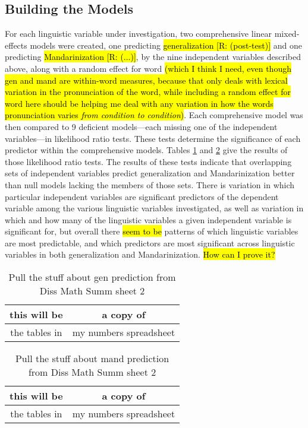 \subsection{Building the Models} 
For each linguistic variable under investigation, two comprehensive linear mixed-effects models were created, one predicting \hl{generalization [R: (post-test)]} and one predicting \hl{Mandarinization [R: (...)]}, by the nine independent variables described above, along with a random effect for word \hl{(which I think I need, even though gen and mand are within-word measures, because that only deals with lexical variation in the pronunciation of the word, while including a random effect for word here should be helping me deal with any variation in how the words pronunciation varies \textit{from condition to condition})}. Each comprehensive model was then compared to 9 deficient models---each missing one of the independent variables---in likelihood ratio tests. These tests determine the significance of each predictor within the comprehensive models. Tables \ref{tab:generalizationPredictors} and \ref{tab:mandarinizationPredictors} give the results of those likelihood ratio tests. The results of these tests indicate that overlapping sets of independent variables predict generalization and Mandarinization better than null models lacking the members of those sets. There is variation in which particular independent variables are significant predictors of the dependent variable among the various linguistic variables investigated, as well as variation in which and how many of the linguistic variables a given independent variable is significant for, but overall there \hl{seem to be} patterns of which linguistic variables are most predictable, and which predictors are most significant across linguistic variables in both generalization and Mandarinization. \hl{How can I prove it?}

\begin{table}[]
    \centering
    \begin{tabular}{|c|c|}
        \hline
        this will be & a copy of \\
        \hline
        the tables in & my numbers spreadsheet\\
        \hline
    \end{tabular}
    \caption{Pull the stuff about gen prediction from Diss Math Summ sheet 2}
    \label{tab:generalizationPredictors}
\end{table}

\begin{table}[]
    \centering
    \begin{tabular}{|c|c|}
        \hline
        this will be & a copy of \\
        \hline
        the tables in & my numbers spreadsheet\\
        \hline
    \end{tabular}
    \caption{Pull the stuff about mand prediction from Diss Math Summ sheet 2}
    \label{tab:mandarinizationPredictors}
\end{table}

